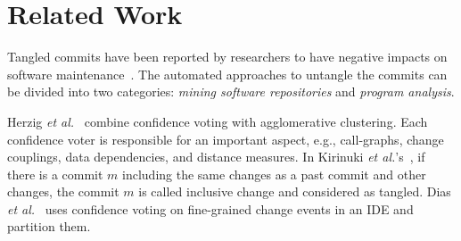 \section{Related Work}
\label{related:sec}

Tangled commits have been reported by researchers to have negative impacts on software maintenance~\cite{tao-fse12,kim-emse16,kim-msr13,hill-tse12,nguyen-issre13,flexeme-fse20,smartcommit-fse21}.
The automated approaches to untangle the commits can be divided
into two categories: {\em mining software repositories} and {\em
  program analysis}.

\vspace{1pt}
 Herzig {\em et
  al.}~\cite{kim-msr13,kim-emse16} combine confidence voting with
agglomerative clustering.
Each confidence voter is responsible for an important aspect, e.g.,
call-graphs, change couplings, data dependencies, and distance
measures. In Kirinuki {\em et al.}'s~\cite{higo-apsec16, higo-icpc14},
if there is a commit $m$ including the same changes as a past commit
and other changes, the commit $m$ is called inclusive change and
considered as tangled. Dias {\em et al.}~\cite{dias-saner15} uses
confidence voting on fine-grained change events in an IDE and
partition them.
%


